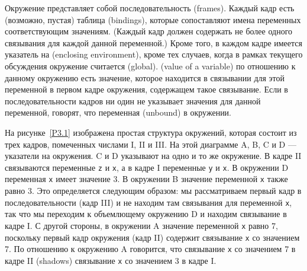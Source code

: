 Окружение представляет собой последовательность
 (frames).  Каждый кадр есть (возможно,
пустая)
таблица  (bindings), которые
сопоставляют имена переменных соответствующим значениям.  (Каждый кадр
должен содержать не более одного связывания для каждой данной
переменной.)  Кроме того, в каждом кадре имеется указатель на
 (enclosing environment), кроме тех случаев, когда в рамках текущего
обсуждения окружение считается
 (global).
 (value of a variable) по отношению к данному окружению есть значение,
которое находится в связывании для этой переменной в первом кадре
окружения, содержащем такое связывание.  Если в последовательности
кадров ни один не указывает значения для данной переменной, говорят,
что переменная
 (unbound)
в окружении.

На рисунке~\ref{P3.1} изображена простая
структура окружений, которая состоит из трех кадров, помеченных
числами I, II и III.  На этой диаграмме A, B, C и D --- указатели на
окружения.  C и D указывают на одно и то же окружение.  В кадре II
связываются переменные {\tt z} и {\tt x}, а в кадре I
переменные {\tt y} и {\tt x}.  В окружении D переменная
{\tt x} имеет значение 3.  В окружении B значение переменной
{\tt x} также равно 3.  Это определяется следующим образом: мы
рассматриваем первый кадр в последовательности (кадр III) и не находим
там связывания для переменной {\tt x}, так что мы переходим к
объемлющему окружению D и находим связывание в кадре I.  С другой
стороны, в окружении A значение переменной {\tt x} равно 7,
поскольку первый кадр окружения (кадр II) содержит связывание
{\tt x} со значением 7.  По отношению к окружению A говорится,
что связывание {\tt x} со значением 7 в кадре II
 (shadows) связывание
{\tt x} со значением 3 в кадре I.

